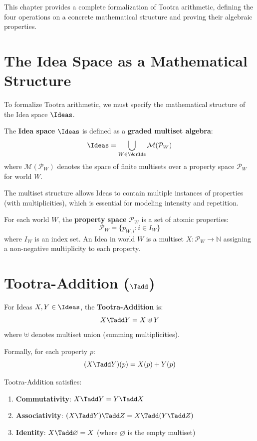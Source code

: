 This chapter provides a complete formalization of Tootra arithmetic, defining the four operations on a concrete mathematical structure and proving their algebraic properties.

\section{The Idea Space as a Mathematical Structure}

To formalize Tootra arithmetic, we must specify the mathematical structure of the Idea space $\Ideas$.

\begin{definition}
\label{def:idea-structure}
The \textbf{Idea space} $\Ideas$ is defined as a \textbf{graded multiset algebra}:
\[
\Ideas = \bigcup_{W \in \Worlds} \mathcal{M}(\mathcal{P}_W)
\]
where $\mathcal{M}(\mathcal{P}_W)$ denotes the space of finite multisets over a property space $\mathcal{P}_W$ for world $W$.
\end{definition}

\begin{remark}
The multiset structure allows Ideas to contain multiple instances of properties (with multiplicities), which is essential for modeling intensity and repetition.
\end{remark}

\begin{definition}
\label{def:property-space}
For each world $W$, the \textbf{property space} $\mathcal{P}_W$ is a set of atomic properties:
\[
\mathcal{P}_W = \{p_{W,i} : i \in I_W\}
\]
where $I_W$ is an index set. An Idea in world $W$ is a multiset $X : \mathcal{P}_W \to \mathbb{N}$ assigning a non-negative multiplicity to each property.
\end{definition}

\section{Tootra-Addition ($\Tadd$)}

\begin{definition}
\label{def:tootra-add}
For Ideas $X, Y \in \Ideas$, the \textbf{Tootra-Addition} is:
\[
X \Tadd Y = X \uplus Y
\]
where $\uplus$ denotes multiset union (summing multiplicities).

Formally, for each property $p$:
\[
(X \Tadd Y)(p) = X(p) + Y(p)
\]
\end{definition}

\begin{theorem}
\label{thm:tadd-properties}
Tootra-Addition satisfies:
\begin{enumerate}
  \item \textbf{Commutativity}: $X \Tadd Y = Y \Tadd X$
  \item \textbf{Associativity}: $(X \Tadd Y) \Tadd Z = X \Tadd (Y \Tadd Z)$
  \item \textbf{Identity}: $X \Tadd \varnothing = X$ (where $\varnothing$ is the empty multiset)
\end{enumerate}
\end{theorem}

